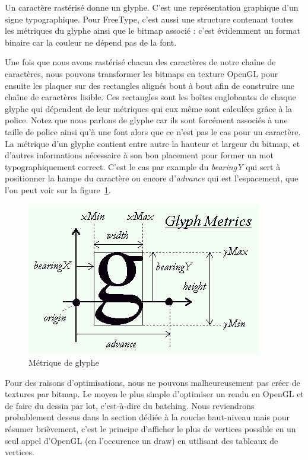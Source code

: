 \documentclass[12pt]{article}
\begin{document}
Un caractère rastérisé donne un glyphe. C'est une représentation graphique d'un signe typographique. Pour FreeType, c'est aussi une structure contenant toutes les métriques
du glyphe ainsi que le bitmap associé : c'est évidemment un format binaire car la couleur ne dépend pas de la font.

Une fois que nous avons rastérisé chacun des caractères de notre chaîne de caractères, nous pouvons transformer les bitmaps en texture OpenGL pour ensuite les plaquer
sur des rectangles alignés bout à bout afin de construire une chaîne de caractères lisible. Ces rectangles sont les boîtes englobantes de chaque glyphe qui dépendent
de leur métriques qui eux même sont calculées grâce à la police.
Notez que nous parlons de glyphe car ils sont forcément associés à une taille de police ainsi qu'à une font alors que ce n'est pas le cas pour un caractère.
La métrique d'un glyphe \cite{metrics} contient entre autre la hauteur et largeur du bitmap, et d'autres informations nécessaire à son bon placement pour former un mot typographiquement correct.
C'est le cas par example du \textit{bearingY} qui sert à positionner la hampe du caractère ou encore d'\textit{advance} qui est l'espacement, que l'on peut voir sur la figure~\ref{fig:metrics}.

\begin{figure}[htp]
  \centering
  \includegraphics[scale=0.8]{images/metrics}
  \caption{Métrique de glyphe}
  \label{fig:metrics}
\end{figure}

Pour des raisons d'optimisations, nous ne pouvons malheureusement pas créer de textures par bitmap. Le moyen le plus simple d'optimiser un rendu en OpenGL et de faire du dessin par lot,
c'est-à-dire du batching. Nous reviendrons probablement dessus dans la section dédiée à la couche haut-niveau mais pour résumer brièvement, c'est le principe d'afficher le plus
de vertices possible en un seul appel d'OpenGL (en l'occurence un draw) en utilisant des tableaux de vertices.
\end{document}
